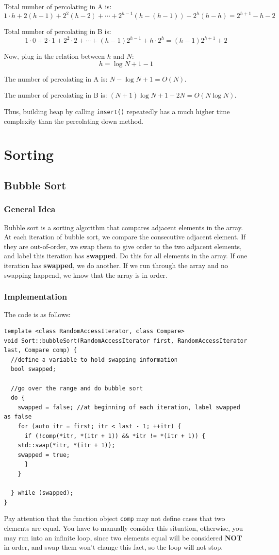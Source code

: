 \documentclass[12pt]{book}
\begin{document}
Total number of percolating in A is:
\[
1 \cdot h + 2(h - 1) + 2^2(h - 2) + \cdots + 2^{h - 1}(h - (h - 1)) + 2^h(h - h)
=2^{h + 1} - h - 2
\]


Total number of percolating in B is:
\[
1 \cdot 0 + 2 \cdot 1 + 2^2 \cdot 2 + \cdots + (h - 1)2^{h - 1} + h \cdot 2^h
= (h - 1)2^{h + 1} + 2
\]

Now, plug in the relation between \(h\) and \(N\):
\[
h = \log{N + 1} - 1
\]

The number of percolating in A is: \(N - \log{N + 1} = O(N)\).

The number of percolating in B is: \((N + 1)\log{N + 1} - 2N = O(N\log{N})\).

Thus, building heap by calling \texttt{insert()} repeatedly has a much higher time complexity than the percolating down method.
\part{Sorting}
\label{sec:org87b7d0d}
\chapter{Bubble Sort}
\label{sec:org86b728e}
\section{General Idea}
\label{sec:org162df6f}
Bubble sort is a sorting algorithm that compares adjacent elements in the array. At each iteration of bubble sort, we compare the consecutive adjacent element. If they are out-of-order, we swap them to give order to the two adjacent elements, and label this iteration has \textbf{swapped}. Do this for all elements in the array. If one iteration has \textbf{swapped}, we do another. If we run through the array and no swapping happend, we know that the array is in order.
\section{Implementation}
\label{sec:org3f0f888}
The code is as follows:
\begin{verbatim}
template <class RandomAccessIterator, class Compare>
void Sort::bubbleSort(RandomAccessIterator first, RandomAccessIterator last, Compare comp) {
  //define a variable to hold swapping information
  bool swapped;

  //go over the range and do bubble sort
  do {
    swapped = false; //at beginning of each iteration, label swapped as false
    for (auto itr = first; itr < last - 1; ++itr) {
      if (!comp(*itr, *(itr + 1)) && *itr != *(itr + 1)) {
	std::swap(*itr, *(itr + 1));
	swapped = true;
      }
    }

  } while (swapped);
}
\end{verbatim}
Pay attention that the function object \texttt{comp} may not define cases that two elements are equal. You have to manually consider this situation, otherwise, you may run into an infinite loop, since two elements equal will be considered \textbf{NOT} in order, and swap them won't change this fact, so the loop will not stop.
\end{document}
